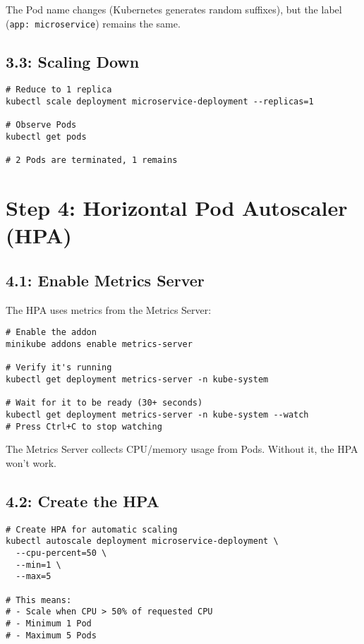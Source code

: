 \documentclass[12pt,a4paper]{article}
\begin{document}
\begin{tipbox}
The Pod name changes (Kubernetes generates random suffixes), but the label (\texttt{app: microservice}) remains the same.
\end{tipbox}

\subsection{3.3: Scaling Down}

\begin{lstlisting}[caption=Scale down]
# Reduce to 1 replica
kubectl scale deployment microservice-deployment --replicas=1

# Observe Pods
kubectl get pods

# 2 Pods are terminated, 1 remains
\end{lstlisting}

\newpage

\section{Step 4: Horizontal Pod Autoscaler (HPA)}

\subsection{4.1: Enable Metrics Server}

The HPA uses metrics from the Metrics Server:

\begin{lstlisting}[caption=Enable Metrics Server]
# Enable the addon
minikube addons enable metrics-server

# Verify it's running
kubectl get deployment metrics-server -n kube-system

# Wait for it to be ready (30+ seconds)
kubectl get deployment metrics-server -n kube-system --watch
# Press Ctrl+C to stop watching
\end{lstlisting}

\begin{importantbox}
The Metrics Server collects CPU/memory usage from Pods. Without it, the HPA won't work.
\end{importantbox}

\subsection{4.2: Create the HPA}

\begin{lstlisting}[caption=Create HPA with kubectl]
# Create HPA for automatic scaling
kubectl autoscale deployment microservice-deployment \
  --cpu-percent=50 \
  --min=1 \
  --max=5

# This means:
# - Scale when CPU > 50% of requested CPU
# - Minimum 1 Pod
# - Maximum 5 Pods
\end{lstlisting}
\end{document}
